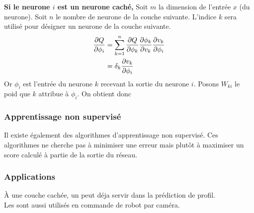 \textbf{Si le neurone $i$ est un neurone caché,}
Soit $m$ la dimension de l'entrée $x$ (du neurone). Soit $n$ le nombre de neurone de la couche suivante.
L'indice $k$ sera utilisé pour désigner un neurone de la couche suivante.
\begin{equation}
 \begin{split}
  \frac{\partial Q}{\partial \phi_i} & = \sum_{k=1}^{n} \frac{\partial Q}{\partial \phi_k} \frac{\partial \phi_k}{\partial v_k} \frac{\partial v_k}{\partial \phi_i}\\
  ~ & = \delta_k \frac{\partial v_k}{\partial \phi_i}
 \end{split}
\end{equation}
Or $\phi_i$ est l'entrée du neurone $k$ recevant la sortie du neurone $i$. Posons $W_{ki}$ le poid que $k$ attribue à $\phi_i$.
On obtient donc \
\subsubsection{Apprentissage non supervisé}
Il existe également des algorithmes d'apprentissage non supervisé.
Ces algorithmes ne cherche pas à minimiser une erreur mais plutôt à maximiser un score calculé à partie de la sortie du réseau.
\subsubsection{Applications}
À une couche cachée, un \mlp peut déja servir dans la prédiction de profil.\cite{statistica}\\
Les \mlp sont aussi utilisés en commande de robot par caméra.\cite{Pomerleau}